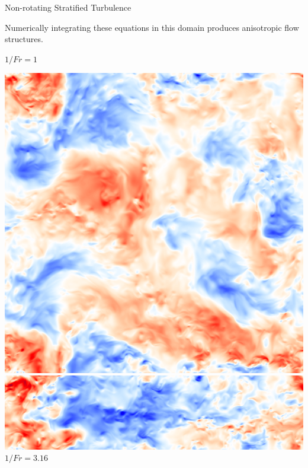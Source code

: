 \documentclass[aspecttatio=169]{beamer}
\begin{document}
\begin{frame}{Non-rotating Stratified Turbulence}
    \centering

    Numerically integrating these equations in this domain produces anisotropic
    flow structures. 

        \centering
        $1/Fr = 1$
        \vspace{2pt}
       
        \includegraphics[width=\textwidth]{images/XYB1ux.png}
        \includegraphics[width=\textwidth]{images/XZB1ux.png}
    \emp
    \hspace{1pt}
        \centering
        $1/Fr = 3.16$
        \vspace{2pt}
        

\end{frame}
\end{document}
